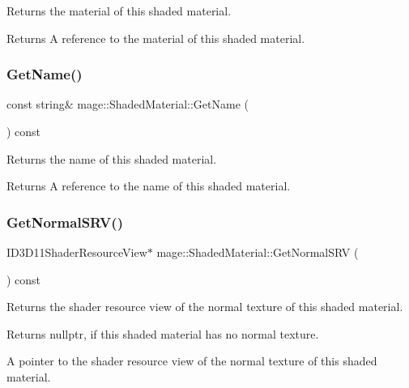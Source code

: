 Returns the material of this shaded material.

\begin{DoxyReturn}{Returns}
A reference to the material of this shaded material. 
\end{DoxyReturn}
\hypertarget{structmage_1_1_shaded_material_af7be0282cc547159cd733475f63eb982}{}\label{structmage_1_1_shaded_material_af7be0282cc547159cd733475f63eb982} 
\subsubsection{\texorpdfstring{Get\+Name()}{GetName()}}
{\footnotesize\ttfamily const string\& mage\+::\+Shaded\+Material\+::\+Get\+Name (\begin{DoxyParamCaption}{ }\end{DoxyParamCaption}) const\hspace{0.3cm}{\ttfamily [noexcept]}}

Returns the name of this shaded material.

\begin{DoxyReturn}{Returns}
A reference to the name of this shaded material. 
\end{DoxyReturn}
\hypertarget{structmage_1_1_shaded_material_a5fd4dfbf132fa697fafbbac082ab8bdb}{}\label{structmage_1_1_shaded_material_a5fd4dfbf132fa697fafbbac082ab8bdb} 
\subsubsection{\texorpdfstring{Get\+Normal\+S\+R\+V()}{GetNormalSRV()}}
{\footnotesize\ttfamily I\+D3\+D11\+Shader\+Resource\+View$\ast$ mage\+::\+Shaded\+Material\+::\+Get\+Normal\+S\+RV (\begin{DoxyParamCaption}{ }\end{DoxyParamCaption}) const\hspace{0.3cm}{\ttfamily [noexcept]}}

Returns the shader resource view of the normal texture of this shaded material.

\begin{DoxyReturn}{Returns}
{\ttfamily nullptr}, if this shaded material has no normal texture. 

A pointer to the shader resource view of the normal texture of this shaded material. 
\end{DoxyReturn}
\hypertarget{structmage_1_1_shaded_material_a2b506a6d1ec48be536cb3318349bb2da}{}\label{structmage_1_1_shaded_material_a2b506a6d1ec48be536cb3318349bb2da} 
